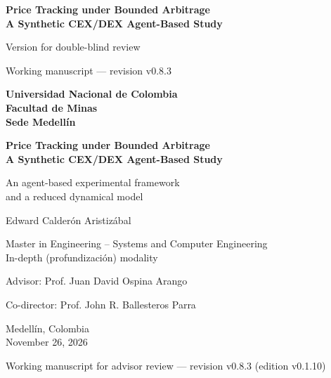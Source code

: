 \documentclass[11pt,letterpaper]{report}
\newcommand{\versionTesis}{v0.1.10}
\newcommand{\revisionManuscrito}{v0.8.3}
\numberwithin{equation}{chapter}
\begin{document}
\begin{titlepage}
  \thispagestyle{empty}
  \centering
  \singlespacing
  \ifdefined\blindreviewmode
  \vspace*{4cm}
  {\LARGE\bfseries Price Tracking under Bounded Arbitrage\\
  A Synthetic CEX/DEX Agent-Based Study\par}
  \vspace{1.2cm}
  {\Large Version for double-blind review\par}
  \vfill
  {\small Working manuscript --- revision \revisionManuscrito{}\par}
  \else
  {\large\bfseries Universidad Nacional de Colombia\\[2pt]
  Facultad de Minas\\[2pt]
  Sede Medellín\par}
  \vspace{3.2cm}
  {\LARGE\bfseries Price Tracking under Bounded Arbitrage\\
  A Synthetic CEX/DEX Agent-Based Study\par}
  \vspace{0.9cm}
  {\Large An agent-based experimental framework\\
  and a reduced dynamical model\par}
  \vspace{2.6cm}
  {\Large Edward Calderón Aristizábal\par}
  \vspace{1.6cm}
  {\large Master in Engineering -- Systems and Computer Engineering\\[2pt]
  In-depth (profundización) modality\par}
  \vspace{0.8cm}
  {\large Advisor: Prof. Juan David Ospina Arango\par}
  {\large Co-director: Prof. John R. Ballesteros Parra\par}
  \vfill
  {\large Medellín, Colombia\\[2pt]
  November 26, 2026\par}
  \vspace{0.3cm}
  {\small Working manuscript for advisor review --- revision \revisionManuscrito{} (edition \versionTesis{})\par}
  \fi
\end{titlepage}

\setcounter{page}{1}
\end{document}
